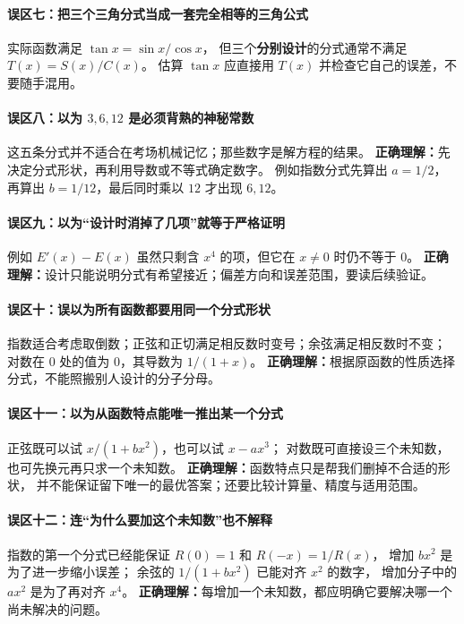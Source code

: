 \begin{trapbox}
\paragraph{误区七：把三个三角分式当成一套完全相等的三角公式}
实际函数满足 $\tan x=\sin x/\cos x$，
但三个\textbf{分别设计}的分式通常不满足 $T(x)=S(x)/C(x)$。
估算 $\tan x$ 应直接用 $T(x)$ 并检查它自己的误差，不要随手混用。

\paragraph{误区八：以为 $3,6,12$ 是必须背熟的神秘常数}
这五条分式并不适合在考场机械记忆；那些数字是解方程的结果。
\textbf{正确理解：}先决定分式形状，再利用导数或不等式确定数字。
例如指数分式先算出 $a=1/2$，再算出 $b=1/12$，最后同时乘以 $12$ 才出现 $6,12$。

\paragraph{误区九：以为“设计时消掉了几项”就等于严格证明}
例如 $E'(x)-E(x)$ 虽然只剩含 $x^4$ 的项，但它在 $x\ne0$ 时仍不等于 $0$。
\textbf{正确理解：}设计只能说明分式有希望接近；偏差方向和误差范围，要读后续验证。

\paragraph{误区十：误以为所有函数都要用同一个分式形状}
指数适合考虑取倒数；正弦和正切满足相反数时变号；余弦满足相反数时不变；
对数在 $0$ 处的值为 $0$，其导数为 $1/(1+x)$。
\textbf{正确理解：}根据原函数的性质选择分式，不能照搬别人设计的分子分母。


\paragraph{误区十一：以为从函数特点能唯一推出某一个分式}
正弦既可以试 $x/(1+bx^2)$，也可以试 $x-ax^3$；
对数既可直接设三个未知数，也可先换元再只求一个未知数。
\textbf{正确理解：}函数特点只是帮我们删掉不合适的形状，
并不能保证留下唯一的最优答案；还要比较计算量、精度与适用范围。

\paragraph{误区十二：连“为什么要加这个未知数”也不解释}
指数的第一个分式已经能保证 $R(0)=1$ 和 $R(-x)=1/R(x)$，
增加 $bx^2$ 是为了进一步缩小误差；
余弦的 $1/(1+bx^2)$ 已能对齐 $x^2$ 的数字，
增加分子中的 $ax^2$ 是为了再对齐 $x^4$。
\textbf{正确理解：}每增加一个未知数，都应明确它要解决哪一个尚未解决的问题。

\end{trapbox}
